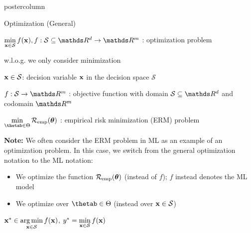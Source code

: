 \documentclass[11pt,compress,t,notes=noshow, xcolor=table]{beamer}
\newlength{\columnheight} %
\begin{document}
\begin{frame}[fragile]{}
\begin{columns}
	\begin{column}{.31\textwidth}
		\begin{beamercolorbox}[center]{postercolumn}
			\begin{minipage}{.98\textwidth}
				\parbox[t][\columnheight]{\textwidth}{
					\begin{myblock}{Optimization (General)}
						\begin{codebox}
							$\min\limits_{\xv \in \mathcal{S}} f(\xv), f: \mathcal{S}\subseteq \R^d \to \R^m$ :
							 optimization problem
						\end{codebox}
						\hspace*{1ex} w.l.o.g. we only consider minimization \\
						\begin{codebox}
							$\mathbf{x} \in \mathcal{S}$: decision variable $\mathbf{x}$ in the decision space $\mathcal{S}$
						\end{codebox}
						\hspace*{1ex}
						\begin{codebox}
							 $f: \mathcal{S} \to \R^m$ : objective function with domain $\mathcal{S} \subseteq \R^d$ and codomain $\R^m$
						\end{codebox}
						\hspace*{1ex} 
						\begin{codebox}
							$\min\limits_{\thetab \in \Theta} \risket$ : empirical risk minimization (ERM) problem
						\end{codebox}
						\hspace*{1ex} \textbf{Note:} We often consider the ERM problem in ML as an example of an optimization problem. In this case, we switch from the general optimization notation to the ML notation: 
						\begin{itemize}
							\item We optimize the function $\mathcal{R}_{\text{emp}}(\bm{\theta})$ (instead of $f$); $f$ instead denotes the ML model
							\item We optimize over $\thetab \in \Theta$ (instead over $\mathbf{x} \in \mathcal{S}$) 
						\end{itemize}
						\hspace*{1ex}			
						\begin{codebox}
							 $\mathbf{x}^\ast \in \mathop{\mathrm{arg\,min}}\limits_{\mathbf{x} \in \mathcal{S}} f(\mathbf{x})$, $y^\ast = \min\limits_{\mathbf{x} \in \mathcal{S}} f(\mathbf{x})$

\end{codebox}
\end{myblock}}
\end{minipage}
\end{beamercolorbox}
\end{column}
\end{columns}
\end{frame}
\end{document}
